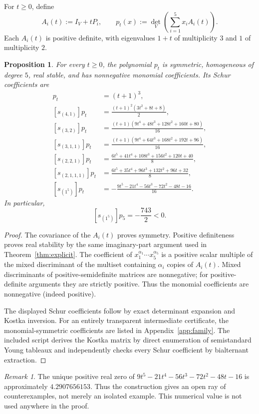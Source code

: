 \documentclass[11pt]{article}
\newtheorem{proposition}[theorem]{Proposition}
\theoremstyle{remark}
\newtheorem{remark}[theorem]{Remark}
\begin{document}
For $t\ge0$, define
\[
A_i(t):=I_V+tP_i,
\qquad
p_t(x):=\det_V\!\left(\sum_{i=1}^5x_iA_i(t)\right).
\]
Each $A_i(t)$ is positive definite, with eigenvalues $1+t$ of multiplicity $3$
and $1$ of multiplicity $2$.

\begin{proposition}
For every $t\ge0$, the polynomial $p_t$ is symmetric, homogeneous of degree $5$,
real stable, and has nonnegative monomial coefficients.  Its Schur coefficients
are
\begin{align*}
[s_{(5)}]p_t&=(t+1)^3,\\
[s_{(4,1)}]p_t&=\frac{(t+1)^2(3t^2+8t+8)}2,\\
[s_{(3,2)}]p_t&=\frac{(t+1)(9t^4+48t^3+128t^2+160t+80)}{16},\\
[s_{(3,1,1)}]p_t&=\frac{(t+1)(9t^4+64t^3+168t^2+192t+96)}{16},\\
[s_{(2,2,1)}]p_t&=\frac{6t^5+41t^4+108t^3+156t^2+120t+40}{8},\\
[s_{(2,1,1,1)}]p_t&=\frac{6t^5+35t^4+96t^3+132t^2+96t+32}{8},\\
[s_{(1^5)}]p_t&=-\frac{9t^5-21t^4-56t^3-72t^2-48t-16}{16}.
\end{align*}
In particular,
\[
[s_{(1^5)}]p_5=-\frac{743}{2}<0.
\]
\end{proposition}

\begin{proof}
The covariance of the $A_i(t)$ proves symmetry.  Positive definiteness proves
real stability by the same imaginary-part argument used in
Theorem~\ref{thm:explicit}.  The coefficient of
$x_1^{\alpha_1}\cdots x_5^{\alpha_5}$ is a positive scalar multiple of the
mixed discriminant of the multiset containing $\alpha_i$ copies of $A_i(t)$.
Mixed discriminants of positive-semidefinite matrices are nonnegative; for
positive-definite arguments they are strictly positive.  Thus the monomial
coefficients are nonnegative (indeed positive).

The displayed Schur coefficients follow by exact determinant expansion and
Kostka inversion.  For an entirely transparent intermediate certificate, the
monomial-symmetric coefficients are listed in Appendix~\ref{app:family}.  The
included script derives the Kostka matrix by direct enumeration of semistandard
Young tableaux and independently checks every Schur coefficient by bialternant
extraction.
\end{proof}

\begin{remark}
The unique positive real zero of
$9t^5-21t^4-56t^3-72t^2-48t-16$ is approximately
$4.2907656153$.  Thus the construction gives an open ray of counterexamples,
not merely an isolated example.  This numerical value is not used anywhere in
the proof.
\end{remark}
\end{document}
